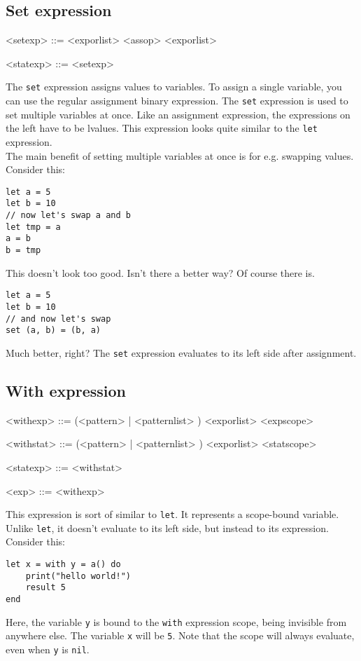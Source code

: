 \documentclass{article}
\newenvironment{bnf}
{
\begin{mdframed}
\begin{grammar}
}
{
\end{grammar}
\end{mdframed}
}
\begin{document}
\subsection{Set expression}
\begin{bnf}
<setexp> ::=  <exporlist> <assop> <exporlist>

<statexp> ::= <setexp>
\end{bnf}
The \verb|set| expression assigns values to variables. To assign a single
variable, you can use the regular assignment binary expression. The \verb|set|
expression is used to set multiple variables at once. Like an assignment
expression, the expressions on the left have to be lvalues. This expression
looks quite similar to the \verb|let| expression.\\
The main benefit of setting multiple variables at once is for e.g. swapping
values. Consider this:
\begin{lstlisting}[language=vortex]
let a = 5
let b = 10
// now let's swap a and b
let tmp = a
a = b
b = tmp
\end{lstlisting}
This doesn't look too good. Isn't there a better way? Of course there is.
\begin{lstlisting}[language=vortex]
let a = 5
let b = 10
// and now let's swap
set (a, b) = (b, a)
\end{lstlisting}
Much better, right? The \verb|set| expression evaluates to its left side
after assignment.
\subsection{With expression}
\begin{bnf}
<withexp> ::=  (<pattern> | \lit{(} <patternlist> \lit{)})
    \lit{=} <exporlist> <expscope>

<withstat> ::=  (<pattern> | \lit{(} <patternlist> \lit{)})
    \lit{=} <exporlist> <statscope>

<statexp> ::= <withstat>

<exp> ::= <withexp>
\end{bnf}
This expression is sort of similar to \verb|let|. It represents a scope-bound
variable. Unlike \verb|let|, it doesn't evaluate to its left side, but instead
to its expression. Consider this:
\begin{lstlisting}[language=vortex]
let x = with y = a() do
    print("hello world!")
    result 5
end
\end{lstlisting}
Here, the variable \verb|y| is bound to the \verb|with| expression scope, being
invisible from anywhere else. The variable \verb|x| will be \verb|5|. Note that
the scope will always evaluate, even when \verb|y| is \verb|nil|.
\end{document}
